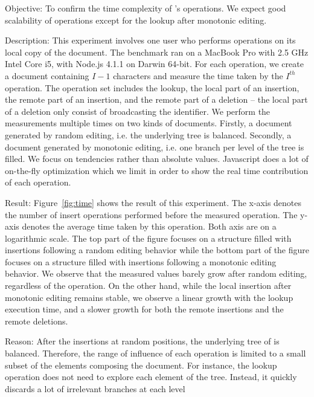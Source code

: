 \begin{asparadesc}
\item [Objective:] To confirm the time complexity of \LSEQ's operations. We
  expect good scalability of operations except for the lookup after monotonic
  editing.
\item [Description:] This experiment involves one user who performs operations
  on its local copy of the document. The benchmark ran on a MacBook Pro with 2.5
  GHz Intel Core i5, with Node.js 4.1.1 on Darwin 64-bit. For each operation, we
  create a document containing $I-1$ characters and measure the time taken by
  the $I^{th}$ operation. The operation set includes the lookup, the local part
  of an insertion, the remote part of an insertion, and the remote part of a
  deletion -- the local part of a deletion only consist of broadcasting the
  identifier. We perform the measurements multiple times on two kinds of
  documents. Firstly, a document generated by random editing, i.e. the
  underlying \LSEQ tree is balanced. Secondly, a document generated by monotonic
  editing, i.e. one branch per level of the \LSEQ tree is filled.  We focus on
  tendencies rather than absolute values. Javascript does a lot of on-the-fly
  optimization which we limit in order to show the real time contribution of
  each operation.
\item [Result:] Figure~\ref{fig:time} shows the result of this experiment. The
  x-axis denotes the number of insert operations performed before the measured
  operation. The y-axis denotes the average time taken by this operation. Both
  axis are on a logarithmic scale. The top part of the figure focuses on a
  structure filled with insertions following a random editing behavior while the
  bottom part of the figure focuses on a structure filled with insertions
  following a monotonic editing behavior. We observe that the measured values
  barely grow after random editing, regardless of the operation. On the other
  hand, while the local insertion after monotonic editing remains stable, we
  observe a linear growth with the lookup execution time, and a slower growth
  for both the remote insertions and the remote deletions.
\item [Reason:] After the insertions at random positions, the underlying tree of
  \LSEQ is balanced. Therefore, the range of influence of each operation is
  limited to a small subset of the elements composing the document. For
  instance, the lookup operation does not need to explore each element of the
  tree. Instead, it quickly discards a lot of irrelevant branches at each level

\end{asparadesc}
